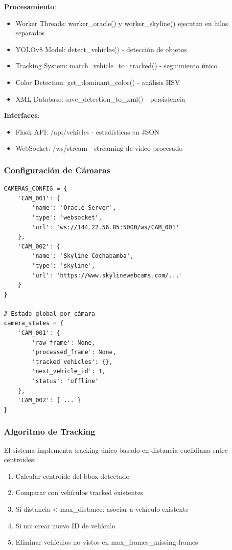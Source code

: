 \textbf{Procesamiento}:
\begin{itemize}
    \item Worker Threads: worker\_oracle() y worker\_skyline() ejecutan en hilos separados
    \item YOLOv8 Model: detect\_vehicles() - detección de objetos
    \item Tracking System: match\_vehicle\_to\_tracked() - seguimiento único
    \item Color Detection: get\_dominant\_color() - análisis HSV
    \item XML Database: save\_detection\_to\_xml() - persistencia
\end{itemize}

\textbf{Interfaces}:
\begin{itemize}
    \item Flask API: /api/vehicles - estadísticas en JSON
    \item WebSocket: /ws/stream - streaming de video procesado
\end{itemize}

\subsubsection{Configuración de Cámaras}

\begin{lstlisting}[caption={Configuración Multi-Cámara}, style=pythonstyle, label=lst:cam-config]
CAMERAS_CONFIG = {
    'CAM_001': {
        'name': 'Oracle Server',
        'type': 'websocket',
        'url': 'ws://144.22.56.85:5000/ws/CAM_001'
    },
    'CAM_002': {
        'name': 'Skyline Cochabamba',
        'type': 'skyline',
        'url': 'https://www.skylinewebcams.com/...'
    }
}

# Estado global por cámara
camera_states = {
    'CAM_001': {
        'raw_frame': None,
        'processed_frame': None,
        'tracked_vehicles': {},
        'next_vehicle_id': 1,
        'status': 'offline'
    },
    'CAM_002': { ... }
}
\end{lstlisting}

\subsubsection{Algoritmo de Tracking}

El sistema implementa tracking único basado en distancia euclidiana entre centroides:

\begin{enumerate}
    \item Calcular centroide del bbox detectado
    \item Comparar con vehículos tracked existentes
    \item Si distancia \textless{} max\_distance: asociar a vehículo existente
    \item Si no: crear nuevo ID de vehículo
    \item Eliminar vehículos no vistos en max\_frames\_missing frames
\end{enumerate}

